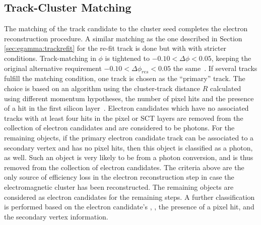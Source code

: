 \subsection{Track-Cluster Matching}
The matching of the track candidate to the cluster seed completes the electron reconstruction procedure.
A similar matching as the one described in Section \ref{sec:egamma:trackrefit} for the re-fit track is done but with with stricter conditions. 
Track-matching in $\phi$ is tightened to $-0.10< \Delta\phi < 0.05$, keeping the original alternative requirement  $-0.10< \Delta\phi_{res} < 0.05$ the same~\cite{Aaboud:2019ynx}.
If several tracks fulfill the matching condition, one track  is chosen as the ``primary'' track. 
The choice is based on an algorithm using the cluster-track distance $R$ calculated using different momentum hypotheses, the number of pixel hits and the presence of a hit in the first silicon layer~\cite{ATLAS-CONF-2014-032}.
Electron candidates which have no associated tracks with at least four
hits in the pixel or SCT layers are removed from the collection of electron
candidates and are considered to be photons.
For the remaining objects, if the primary electron candidate track can be
associated to a secondary vertex and has no pixel hits,
then this object is classified as a photon, as well.
Such an object is very likely to be from a photon conversion, and is thus removed from the collection of electron candidates.
The criteria above are the only source of efficiency loss in the electron reconstruction step in case the electromagnetic cluster has been reconstructed.
The remaining objects are considered as electron candidates for the remaining steps.
A further classification is performed based on the electron candidate's \eoverp, \pt, the presence of a pixel hit, and the secondary vertex information.
